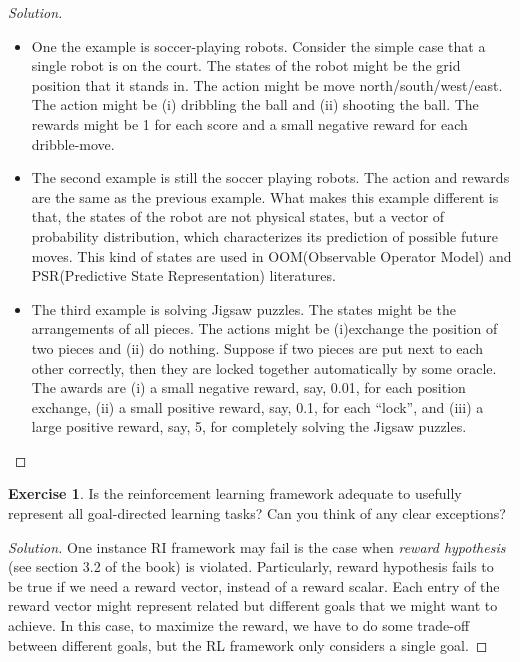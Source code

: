 \documentclass[oneside,11pt]{article}
\theoremstyle{definition}
\newtheorem{exer}[thm]{Exercise}
\newenvironment{solution}
{\renewcommand\qedsymbol{$\blacksquare$}\begin{proof}[Solution]} {\end{proof}}
\begin{document}
\begin{shaded}
\begin{solution} 
\begin{itemize}
\item  One the example is soccer-playing robots. Consider the simple case that a single robot is on the court. The states of the robot might be the grid position that it stands in. The action might be move north/south/west/east. The action might be (i) dribbling the ball and (ii) shooting the ball. The rewards might be 1 for each score and a small negative reward for each dribble-move. 

\item The second example is still the soccer playing robots. The action and rewards are the same as the previous example. What makes this example different is that, the states of the robot are not physical states, but a vector of probability distribution, which characterizes its prediction of possible future moves. This kind of states are used in OOM(Observable Operator Model) and PSR(Predictive State Representation) literatures.
 
\item The third example is solving Jigsaw puzzles. The states might be the arrangements of all pieces. The actions might be (i)exchange the position of two pieces and (ii) do nothing. Suppose if two pieces are put next to each other correctly, then they are locked together automatically by some oracle. The awards are (i) a small negative reward, say, 0.01, for each position exchange, (ii) a small positive reward, say, 0.1, for each ``lock'', and (iii) a large positive reward, say, 5, for completely solving the Jigsaw puzzles. 

\end{itemize}
\end{solution}
\end{shaded}


\begin{exer}
Is the reinforcement learning framework adequate to usefully represent all goal-directed learning tasks? Can you think of any clear exceptions?
\end{exer}

\begin{shaded}
\begin{solution}
One instance RI framework may fail is the case when \emph{reward hypothesis} (see section 3.2 of the book) is violated. Particularly, reward hypothesis fails to be true if we need a reward vector, instead of a reward scalar. Each entry of the reward vector might represent related but different goals that we might want to achieve. In this case, to maximize the reward, we have to do some trade-off between different goals, but the RL framework only considers a single goal.
\end{solution}
\end{shaded}
\end{document}
